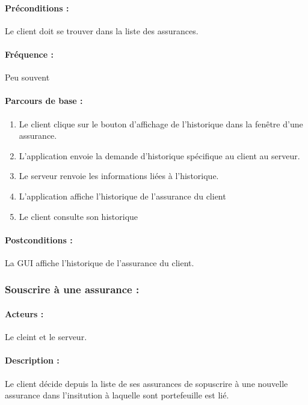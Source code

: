 \documentclass[../annexe.tex]{subfiles}
\begin{document}
\paragraph{Préconditions :} Le client doit se trouver dans la liste des assurances.

\paragraph{Fréquence :} Peu souvent 

\paragraph{Parcours de base :} 

	\begin{enumerate}
		\item Le client clique sur le bouton d'affichage de l'historique dans la fenêtre d'une assurance.
		\item L'application envoie la demande d'historique spécifique au client au serveur.
		\item Le serveur renvoie les informations liées à l'historique.
		\item L'application affiche l'historique de l'assurance du client
		\item Le client consulte son historique 
	\end{enumerate}

\paragraph{Postconditions :} La GUI affiche l'historique de l'assurance du client.

\newpage

\subsubsection{Souscrire à une assurance :}

\paragraph{Acteurs :}

		Le cleint et le serveur.

\paragraph{Description :}
		
		Le client décide depuis la liste de ses assurances de sopuscrire à une nouvelle assurance dans l'insitution à laquelle sont portefeuille est lié.
\end{document}
